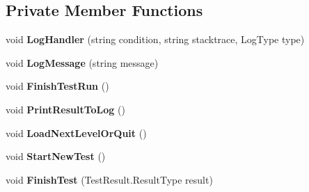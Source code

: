 \subsection*{Private Member Functions}
\begin{DoxyCompactItemize}
\item 
\mbox{\label{class_unity_test_1_1_test_runner_a809b5eb7e177b13ee26813326aff98a0}} 
void {\bfseries Log\+Handler} (string condition, string stacktrace, Log\+Type type)
\item 
\mbox{\label{class_unity_test_1_1_test_runner_a03ce3d82aec4b0d100ab593ece464b51}} 
void {\bfseries Log\+Message} (string message)
\item 
\mbox{\label{class_unity_test_1_1_test_runner_acc50c3107b62ce11d3137550fc020871}} 
void {\bfseries Finish\+Test\+Run} ()
\item 
\mbox{\label{class_unity_test_1_1_test_runner_a8c6756f9df87dc483a133b6fcdebd300}} 
void {\bfseries Print\+Result\+To\+Log} ()
\item 
\mbox{\label{class_unity_test_1_1_test_runner_ad180c73b7e0b37ad082815317e07272c}} 
void {\bfseries Load\+Next\+Level\+Or\+Quit} ()
\item 
\mbox{\label{class_unity_test_1_1_test_runner_a9369f8ff8565f8162e931dfad4f62d9d}} 
void {\bfseries Start\+New\+Test} ()
\item 
\mbox{\label{class_unity_test_1_1_test_runner_ae5b967e3c9433164e54182a4f44122a9}} 
void {\bfseries Finish\+Test} (Test\+Result.\+Result\+Type result)
\end{DoxyCompactItemize}
